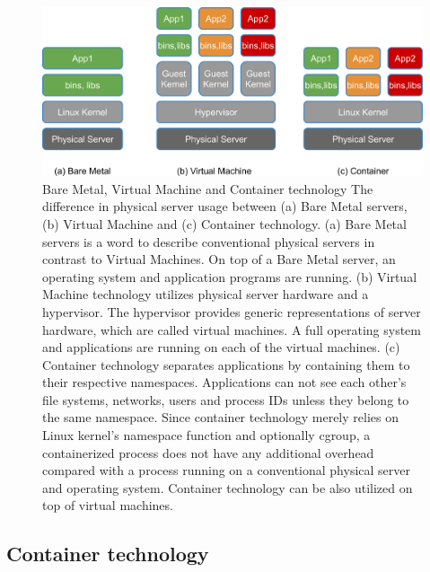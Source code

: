 \begin{figure}[h]
\begin{center}
\includegraphics[width=0.75\columnwidth]{Figs/physical_vm_container.png}
\end{center}

\par\bigskip
  \centering
  \begin{minipage}{0.95\columnwidth}
    \caption[Bare Metal, Virtual Machine and Container technology]{
      Bare Metal, Virtual Machine and Container technology
      The difference in physical server usage between (a) Bare Metal servers, (b) Virtual Machine and (c) Container technology.
      (a) Bare Metal servers is a word to describe conventional physical servers in contrast to Virtual Machines.
      On top of a Bare Metal server, an operating system and application programs are running.
      (b) Virtual Machine technology utilizes physical server hardware and a hypervisor.
      The hypervisor provides generic representations of server hardware, which are called virtual machines.
      A full operating system and applications are running on each of the virtual machines.
      (c) Container technology separates applications by containing them to their respective namespaces.
      Applications can not see each other's file systems, networks, users and process IDs unless they belong to the same namespace.
      Since container technology merely relies on Linux kernel's namespace function and optionally cgroup, a containerized process does not have any additional overhead compared with a process running on a conventional physical server and operating system.
      Container technology can be also utilized on top of virtual machines.
    }
    \label{fig:physical_vm_container}
  \end{minipage}
\end{figure}

\subsection{Container technology}

